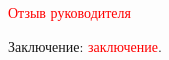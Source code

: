 \documentclass[fontsize=12pt]{diploma}
\begin{document}
\fillReviewHeader

\textcolor{red}{Отзыв руководителя}

\makeSimilarityLine

Заключение: \textcolor{red}{заключение}.

\makeReviewSignature
\end{document}
